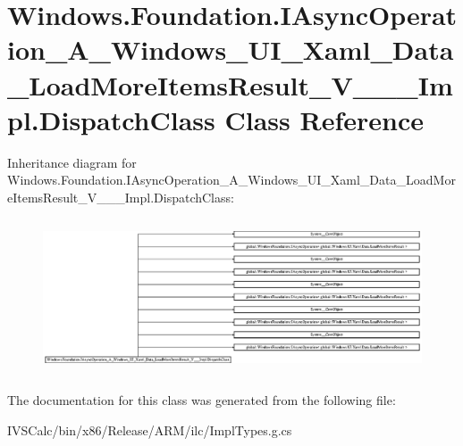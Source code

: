 \hypertarget{class_windows_1_1_foundation_1_1_i_async_operation___a___windows___u_i___xaml___data___load_moreafb81ae31c9de92d8792aa9536ec5cfd}{}\section{Windows.\+Foundation.\+I\+Async\+Operation\+\_\+\+A\+\_\+\+Windows\+\_\+\+U\+I\+\_\+\+Xaml\+\_\+\+Data\+\_\+\+Load\+More\+Items\+Result\+\_\+\+V\+\_\+\+\_\+\+\_\+\+Impl.\+Dispatch\+Class Class Reference}
\label{class_windows_1_1_foundation_1_1_i_async_operation___a___windows___u_i___xaml___data___load_moreafb81ae31c9de92d8792aa9536ec5cfd}
Inheritance diagram for Windows.\+Foundation.\+I\+Async\+Operation\+\_\+\+A\+\_\+\+Windows\+\_\+\+U\+I\+\_\+\+Xaml\+\_\+\+Data\+\_\+\+Load\+More\+Items\+Result\+\_\+\+V\+\_\+\+\_\+\+\_\+\+Impl.\+Dispatch\+Class\+:\begin{figure}[H]
\begin{center}
\leavevmode
\includegraphics[height=4.631579cm]{class_windows_1_1_foundation_1_1_i_async_operation___a___windows___u_i___xaml___data___load_moreafb81ae31c9de92d8792aa9536ec5cfd}
\end{center}
\end{figure}


The documentation for this class was generated from the following file\+:\begin{DoxyCompactItemize}
\item 
I\+V\+S\+Calc/bin/x86/\+Release/\+A\+R\+M/ilc/Impl\+Types.\+g.\+cs\end{DoxyCompactItemize}

